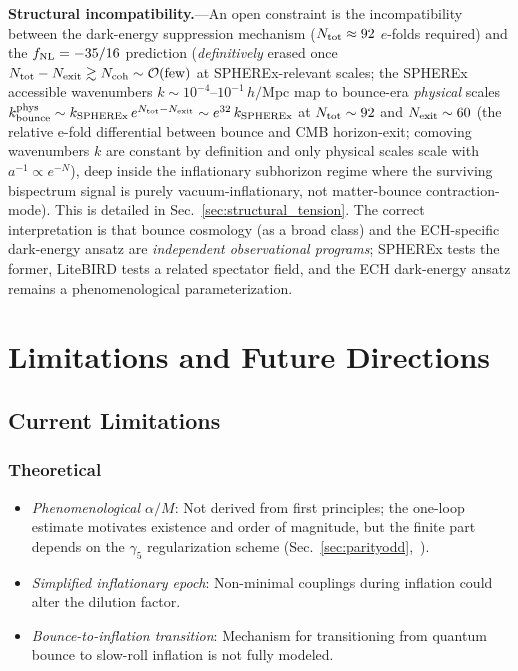 \documentclass[aps,prd,twocolumn,superscriptaddress,showpacs,preprintnumbers,nofootinbib,longbibliography,floatfix]{revtex4-2}
\newcommand{\fnl}{f_{\rm NL}}
\begin{document}
\textbf{Structural incompatibility.}---An open constraint is the incompatibility
between the dark-energy suppression mechanism ($N_{\rm tot}\approx 92$ $e$-folds
required) and the $\fnl=-35/16$ prediction (\emph{definitively} erased once $N_{\rm tot}-N_{\rm exit}\gtrsim N_{\rm coh}\sim\mathcal{O}(\text{few})$ at SPHEREx-relevant scales; the SPHEREx accessible wavenumbers $k\sim 10^{-4}$--$10^{-1}\,h/$Mpc map to bounce-era \emph{physical} scales $k^{\rm phys}_{\rm bounce}\sim k_{\rm SPHEREx}\,e^{N_{\rm tot}-N_{\rm exit}}\sim e^{32}\,k_{\rm SPHEREx}$ at $N_{\rm tot}\sim 92$ and $N_{\rm exit}\sim 60$ (the relative e-fold differential between bounce and CMB horizon-exit; comoving wavenumbers $k$ are constant by definition and only physical scales scale with $a^{-1}\!\propto\!e^{-N}$), deep inside the inflationary subhorizon regime where the surviving bispectrum signal is purely vacuum-inflationary, not matter-bounce contraction-mode). This
is detailed in Sec.~\ref{sec:structural_tension}. The correct interpretation is
that bounce cosmology (as a broad class) and the ECH-specific dark-energy
ansatz are \textit{independent observational programs}; SPHEREx tests the former,
LiteBIRD tests a related spectator field, and the ECH dark-energy ansatz remains
a phenomenological parameterization.


\section{Limitations and Future Directions}\label{sec:limitations}
\label{sec:futuredirections}

\subsection{Current Limitations}

\subsubsection{Theoretical}
\begin{itemize}[leftmargin=*]
\item \textit{Phenomenological $\alpha/M$}: Not derived from first principles;
the one-loop estimate motivates existence and order of magnitude, but the finite
part depends on the $\gamma_5$ regularization scheme
(Sec.~\ref{sec:parityodd},~\cite{ShapiroTeixeira2014}).
\item \textit{Simplified inflationary epoch}: Non-minimal couplings during
inflation could alter the dilution factor.
\item \textit{Bounce-to-inflation transition}: Mechanism for transitioning from
quantum bounce to slow-roll inflation is not fully modeled.
\end{itemize}
\end{document}
